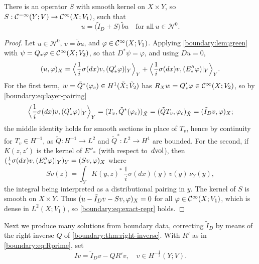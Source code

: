 \begin{proposition}\label{boundary:prop:exact-repr}
There is an operator $S$ with smooth kernel on $X\times Y$, so $S:\mathcal{C}^{-\infty}(Y;V)\to
\mathcal{C}^\infty(X;V_1)$, such that
\begin{equation}\label{boundary:eq:exact-repr}
u=\big(\tilde I_D+S\big)\,\tilde bu\quad\text{for all}\ u\in\mathcal{N}^0.
\end{equation}
\end{proposition}
\begin{proof}
Let $u\in\mathcal{N}^0$, $v=\tilde bu$, and $\varphi\in\mathcal{C}^\infty(X;V_1)$. Applying
\cref{boundary:lem:green} with $\psi=Q_*\varphi\in\mathcal{C}^\infty(X;V_2)$, so that $D^*\psi=\varphi$,
and using $Du=0$,
\begin{equation*}
( u, \varphi)_X=\Big\langle\frac1i\sigma(dx)v,(Q'_*\varphi)|_Y\Big\rangle_Y+
\Big\langle\frac1i\sigma(dx)v,(E''_*\varphi)|_Y\Big\rangle_Y.
\end{equation*}
For the first term, $w=\tilde Q^*(\varphi_c)\in H^1(\tilde{X};\tilde V_2)$ has $R_Xw=Q'_*\varphi
\in\mathcal{C}^\infty(X;V_2)$, so by \eqref{boundary:eq:layer-pairing}
\begin{equation*}
\Big\langle\frac1i\sigma(dx)v,(Q'_*\varphi)|_Y\Big\rangle_Y=( T_v, \tilde Q^*
(\varphi_c))_{\tilde{X}}=( \tilde QT_v, \varphi_c)_{\tilde{X}}=( \tilde I_Dv, \varphi)_X;
\end{equation*}
the middle identity holds for smooth sections in place of $T_v$, hence by continuity for
$T_v\in H^{-1}$, as $\tilde Q:H^{-1}\to L^2$ and $\tilde Q^*:L^2\to H^1$ are bounded.
For the second, if $K(z,z')$ is the kernel of $E''_*$ (with respect to $\,d\mathrm{vol}$), then
$( \frac1i\sigma(dx)v, (E''_*\varphi)|_Y)_Y=( Sv, \varphi)_X$ where
\begin{equation*}
Sv(z)=\int_YK(y,z)^*\,\frac1i\sigma(dx)(y)\,v(y)\,\nu_Y(y),
\end{equation*}
the integral being interpreted as a distributional pairing in $y$. The kernel of $S$ is
smooth on $X\times Y$. Thus $( u-\tilde I_Dv-Sv, \varphi)_X=0$ for all $\varphi\in
\mathcal{C}^\infty(X;V_1)$, which is dense in $L^2(X;V_1)$, so \eqref{boundary:eq:exact-repr} holds.
\end{proof}

Next we produce many solutions from boundary data, correcting $\tilde I_D$ by means of
the right inverse $Q$ of \cref{boundary:thm:right-inverse}. With $R'$ as in
\eqref{boundary:eq:Rprime}, set
\begin{equation*}
Iv=\tilde I_Dv-QR'v,\quad v\in H^{-\frac12}(Y;V).
\end{equation*}


